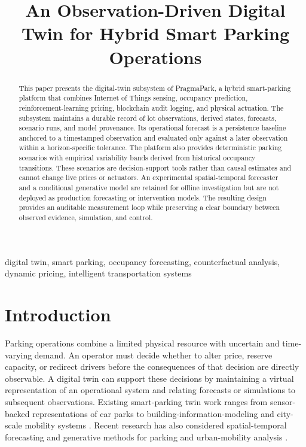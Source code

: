 \documentclass[conference]{IEEEtran}
\begin{document}
\title{An Observation-Driven Digital Twin for Hybrid Smart Parking Operations}

\author{
}

\maketitle

\begin{abstract}
This paper presents the digital-twin subsystem of PragmaPark, a hybrid smart-parking platform that combines Internet of Things sensing, occupancy prediction, reinforcement-learning pricing, blockchain audit logging, and physical actuation. The subsystem maintains a durable record of lot observations, derived states, forecasts, scenario runs, and model provenance. Its operational forecast is a persistence baseline anchored to a timestamped observation and evaluated only against a later observation within a horizon-specific tolerance. The platform also provides deterministic parking scenarios with empirical variability bands derived from historical occupancy transitions. These scenarios are decision-support tools rather than causal estimates and cannot change live prices or actuators. An experimental spatial-temporal forecaster and a conditional generative model are retained for offline investigation but are not deployed as production forecasting or intervention models. The resulting design provides an auditable measurement loop while preserving a clear boundary between observed evidence, simulation, and control.
\end{abstract}

\begin{IEEEkeywords}
digital twin, smart parking, occupancy forecasting, counterfactual analysis, dynamic pricing, intelligent transportation systems
\end{IEEEkeywords}

\section{Introduction}
Parking operations combine a limited physical resource with uncertain and time-varying demand. An operator must decide whether to alter price, reserve capacity, or redirect drivers before the consequences of that decision are directly observable. A digital twin can support these decisions by maintaining a virtual representation of an operational system and relating forecasts or simulations to subsequent observations. Existing smart-parking twin work ranges from sensor-backed representations of car parks to building-information-modeling and city-scale mobility systems \cite{b2,b3,b13}. Recent research has also considered spatial-temporal forecasting and generative methods for parking and urban-mobility analysis \cite{b1,b20}.
\end{document}
